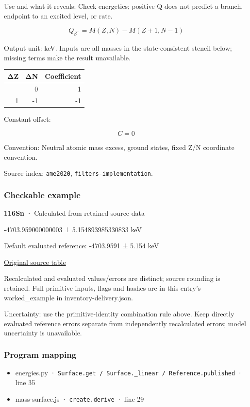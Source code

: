 \documentclass[
  11pt,
  letterpaper,
]{article}
\providecommand{\tightlist}{%
  \setlength{\itemsep}{0pt}\setlength{\parskip}{0pt}}
\begin{document}
Use and what it reveals: Check energetics; positive Q does not predict a
branch, endpoint to an excited level, or rate.

\[
Q_{\beta^-}=M(Z,N)-M(Z+1,N-1)
\]

Output unit: keV. Inputs are all masses in the state-consistent stencil
below; missing terms make the result unavailable.

\begin{longtable}[]{@{}rrr@{}}
\toprule\noalign{}
ΔZ & ΔN & Coefficient \\
\midrule\noalign{}
\endhead
\bottomrule\noalign{}
\endlastfoot
0 & 0 & 1 \\
1 & -1 & -1 \\
\end{longtable}

Constant offset:

\[
C=0
\]

Convention: Neutral atomic mass excess, ground states, fixed Z/N
coordinate convention.

Source index: \texttt{ame2020}, \texttt{filters-implementation}.

\subsubsection{Checkable example}\label{checkable-example-7}

\textbf{116Sn} · Calculated from retained source data

-4703.959000000003 ± 5.154893985330833 keV

Default evaluated reference: -4703.9591 ± 5.154 keV

\href{https://www-nds.iaea.org/amdc/ame2020/mass_1.mas20.txt}{Original
source table}

Recalculated and evaluated values/errors are distinct; source rounding
is retained. Full primitive inputs, flags and hashes are in this entry's
worked\_example in inventory-delivery.json.

Uncertainty: use the primitive-identity combination rule above. Keep
directly evaluated reference errors separate from independently
recalculated errors; model uncertainty is unavailable.

\subsubsection{Program mapping}\label{program-mapping-7}

\begin{itemize}
\tightlist
\item
  energies.py ·
  \texttt{Surface.get\ /\ Surface.\_linear\ /\ Reference.published} ·
  line 35
\item
  mass-surface.js · \texttt{create.derive} · line 29
\end{itemize}
\end{document}
